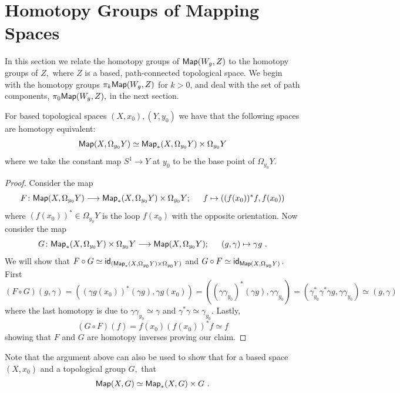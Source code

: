 \section{Homotopy Groups of Mapping Spaces}
In this section we relate the homotopy groups of ${\sf Map}(W_{g}, Z)$ to the homotopy groups of $Z,$ where $Z$ is a based, path-connected topological space. We begin with the homotopy groups $\pi_{k}{\sf Map}(W_{g}, Z)$ for $k > 0$, and deal with the set of path components, $\pi_{0}{\sf Map}(W_{g}, Z),$ in the next section.

\begin{lemma} \label{moreuniqlemma1}
For based topological spaces $(X, x_{0}), (Y, y_{0})$ we have that the following spaces are homotopy equivalent:
\[
{\sf Map}(X, \Omega_{y_{0}}Y) \simeq {\sf Map}_{\ast}(X, \Omega_{y_{0}}Y) \times \Omega_{y_{0}}Y
\]
where we take the constant map $S^{1} \rightarrow Y$ at $y_{0}$ to be the base point of $\Omega_{y_{0}}Y.$
\end{lemma}
\begin{proof}
Consider the map 
\[
F \colon {\sf Map}(X, \Omega_{y_{0}}Y) \longrightarrow {\sf Map}_{\ast}(X, \Omega_{y_{0}}Y) \times \Omega_{y_{0}}Y; \hspace{15pt} f \mapsto ((f(x_{0}))^{\ast}f, f(x_{0}))
\]
where $(f(x_{0}))^{\ast} \in \Omega_{y_{0}}Y$ is the loop $f(x_{0})$ with the opposite orientation.
Now consider the map
\[
G \colon {\sf Map}_{\ast}(X, \Omega_{y_{0}}Y) \times \Omega_{y_{0}}Y \longrightarrow {\sf Map}(X, \Omega_{y_{0}}Y); \hspace{15pt} (g, \gamma) \mapsto \gamma g~.
\]
We will show that $F \circ G \simeq \operatorname{\sf id}_{({\sf Map}_{\ast}(X, \Omega_{y_{0}}Y) \times \Omega_{y_{0}}Y)}$ and $G \circ F \simeq \operatorname{\sf id}_{{\sf Map}(X, \Omega_{y_{0}}Y)}.$ First
\[
(F \circ G)(g, \gamma) = ((\gamma g(x_{0}))^{\ast}(\gamma g), \gamma g(x_{0})) = ((\gamma \gamma_{y_{0}})^{\ast}(\gamma g), \gamma \gamma_{y_{0}}) = (\gamma_{y_{0}}^{\ast} \gamma^{\ast} \gamma g, \gamma \gamma_{y_{0}}) \simeq (g, \gamma)
\]
where the last homotopy is due to $\gamma \gamma_{y_{0}} \simeq \gamma$ and $\gamma^{\ast} \gamma \simeq \gamma_{y_{0}}.$ Lastly,
\[
(G \circ F)(f) = f(x_{0})(f(x_{0}))^{\ast}f \simeq f
\]
showing that $F$ and $G$ are homotopy inverses proving our claim.
\end{proof}

\begin{observation} \label{oooo}
Note that the argument above can also be used to show that for a based space $(X, x_{0})$ and a topological group $G,$ that 
\[
{\sf Map}(X, G) \simeq {\sf Map}_{\ast}(X, G) \times G~.
\]
\end{observation}


